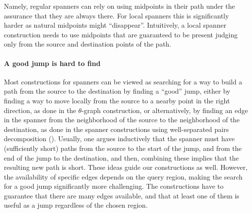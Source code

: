 Namely, regular spanners can rely on using midpoints in their path
under the assurance that they are always there. For local spanners
this is significantly harder as natural midpoints might
``disappear''. Intuitively, a local spanner construction needs to use
midpoints that are guaranteed to be present judging only from the
source and destination points of the path.

\paragraph*{A good jump is hard to find}

Most constructions for spanners can be viewed as searching for a way
to build a path from the source to the destination by finding a
``good'' jump, either by finding a way to move locally from the source
to a nearby point in the right direction, as done in the
$\theta$-graph construction, or alternatively, by finding an edge in
the spanner from the neighborhood of the source to the neighborhood of
the destination, as done in the spanner constructions using
well-separated pairs decomposition (\WSPD). Usually, one argues
inductively that the spanner must have (sufficiently short) paths from
the source to the start of the jump, and from the end of the jump to
the destination, and then, combining these implies that the resulting new
path is short.  These ideas guide our constructions as well. However,
the availability of specific edges depends on the query region, making
the search for a good jump significantly more challenging. The
constructions have to guarantee that there are many edges available,
and that at least one of them is useful as a jump regardless of the chosen region.


